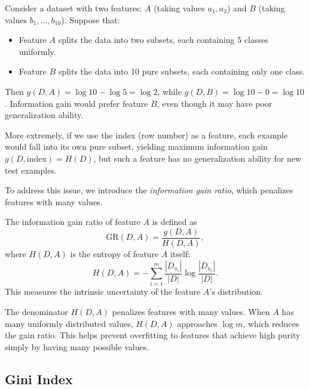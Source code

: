 \documentclass[../main]{subfiles}
\begin{document}
\begin{example}
    Consider a dataset with two features: $A$ (taking values $a_1, a_2$) and $B$ (taking values $b_1, \ldots, b_{10}$).  Suppose that:
    \begin{itemize}
        \item Feature $A$ splits the data into two subsets, each containing 5 classes uniformly.
        \item Feature $B$ splits the data into 10 pure subsets, each containing only one class.
    \end{itemize}
    Then $g(D,A) = \log 10 - \log 5 = \log 2$, while $g(D,B) = \log 10 - 0 = \log 10$.
    Information gain would prefer feature $B$, even though it may have poor generalization ability.
    
    More extremely, if we use the index (row number) as a feature, each example would fall into its own pure subset, yielding maximum information gain $g(D,\mathrm{index}) = H(D)$, but such a feature has no generalization ability for new test examples.
\end{example}

To address this issue, we introduce the \emph{information gain ratio}, which penalizes features with many values.

\begin{definition}
    The information gain ratio of feature $A$ is defined as
    \begin{equation}
        \mathrm{GR}(D,A)
        = \frac{g(D,A)}{H(D,A)},
    \end{equation}
    where $H(D,A)$ is the entropy of feature $A$ itself:
    \begin{equation}
        H(D,A)
        = -\sum_{i=1}^m \frac{|D_{a_i}|}{|D|}\log\frac{|D_{a_i}|}{|D|}.
    \end{equation}
    This measures the intrinsic uncertainty of the feature $A$'s distribution.
\end{definition}

The denominator $H(D,A)$ penalizes features with many values.  When $A$ has many uniformly distributed values, $H(D,A)$ approaches $\log m$, which reduces the gain ratio.  This helps prevent overfitting to features that achieve high purity simply by having many possible values.

\subsection{Gini Index}
\end{document}
